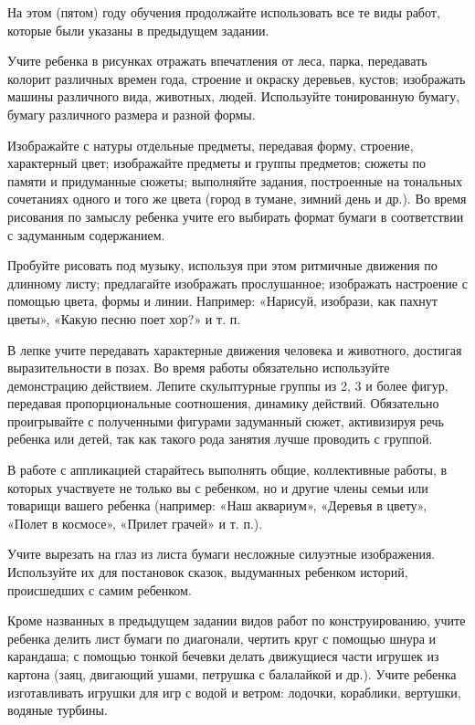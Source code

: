 \documentclass[a5paper]{book}
\begin{document}
На этом (пятом) году обучения продолжайте использовать все те виды
работ, которые были указаны в предыдущем задании.

Учите ребенка в рисунках отражать впечатления от леса, парка, передавать
колорит различных времен года, строение и окраску деревьев, кустов;
изображать машины различного вида, животных, людей. Используйте
тонированную бумагу, бумагу различного размера и разной формы.

Изображайте с натуры отдельные предметы, передавая форму, строение,
характерный цвет; изображайте предметы и группы предметов; сюжеты по
памяти и придуманные сюжеты; выполняйте задания, построенные на
тональных сочетаниях одного и того же цвета (город в тумане, зимний день
и др.). Во время рисования по замыслу ребенка учите его выбирать формат
бумаги в соответствии с задуманным содержанием.

Пробуйте рисовать под музыку, используя при этом ритмичные движения по
длинному листу; предлагайте изображать прослушанное; изображать
настроение с помощью цвета, формы и линии. Например: «Нарисуй, изобрази,
как пахнут цветы», «Какую песню поет хор?» и т. п.

В лепке учите передавать характерные движения человека и животного,
достигая выразительности в позах. Во время работы обязательно
используйте демонстрацию действием. Лепите скульптурные группы из 2, 3 и
более фигур, передавая пропорциональные соотношения, динамику действий.
Обязательно проигрывайте с полученными фигурами задуманный сюжет,
активизируя речь ребенка или детей, так как такого рода занятия лучше
проводить с группой.

В работе с аппликацией старайтесь выполнять общие, коллективные работы,
в которых участвуете не только вы с ребенком, но и другие члены семьи
или товарищи вашего ребенка (например: «Наш аквариум», «Деревья в
цвету», «Полет в космосе», «Прилет грачей» и т. п.).

Учите вырезать на глаз из листа бумаги несложные силуэтные изображения.
Используйте их для постановок сказок, выдуманных ребенком историй,
происшедших с самим ребенком.

Кроме названных в предыдущем задании видов работ по конструированию,
учите ребенка делить лист бумаги по диагонали, чертить круг с помощью
шнура и карандаша; с помощью тонкой бечевки делать движущиеся части
игрушек из картона (заяц, двигающий ушами, петрушка с балалайкой и др.).
Учите ребенка изготавливать игрушки для игр с водой и ветром: лодочки,
кораблики, вертушки, водяные турбины.
\end{document}
